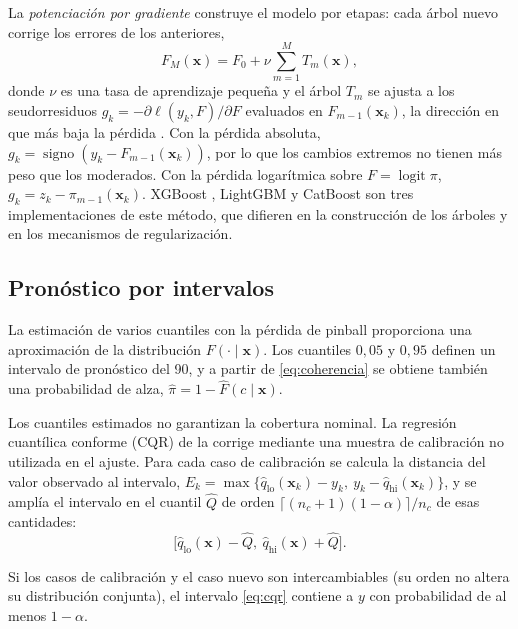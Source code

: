 La \emph{potenciación por gradiente} construye el modelo por etapas: cada árbol nuevo corrige los errores de los anteriores,
\begin{equation}
F_M(\mathbf{x})=F_0+\nu\sum_{m=1}^{M}T_m(\mathbf{x}),
\end{equation}
donde $\nu$ es una tasa de aprendizaje pequeña y el árbol $T_m$ se ajusta a los seudorresiduos $g_k=-\partial\ell(y_k,F)/\partial F$ evaluados en $F_{m-1}(\mathbf{x}_k)$, la dirección en que más baja la pérdida \citep{friedman2001}. Con la pérdida absoluta, $g_k=\operatorname{signo}(y_k-F_{m-1}(\mathbf{x}_k))$, por lo que los cambios extremos no tienen más peso que los moderados. Con la pérdida logarítmica sobre $F=\operatorname{logit}\pi$, $g_k=z_k-\pi_{m-1}(\mathbf{x}_k)$. XGBoost \citep{chen2016}, LightGBM \citep{ke2017} y CatBoost \citep{prokhorenkova2018} son tres implementaciones de este método, que difieren en la construcción de los árboles y en los mecanismos de regularización.


\subsection{Pronóstico por intervalos}
\label{sec:cuantilica}

La estimación de varios cuantiles con la pérdida de pinball proporciona una aproximación de la distribución $F(\cdot\mid\mathbf{x})$. Los cuantiles $0{,}05$ y $0{,}95$ definen un intervalo de pronóstico del 90\pct, y a partir de \eqref{eq:coherencia} se obtiene también una probabilidad de alza, $\hat\pi=1-\hat F(c\mid\mathbf{x})$.

Los cuantiles estimados no garantizan la cobertura nominal. La regresión cuantílica conforme (CQR) de \citet{romano2019} la corrige mediante una muestra de calibración no utilizada en el ajuste. Para cada caso de calibración se calcula la distancia del valor observado al intervalo, $E_k=\max\{\hat q_{\mathrm{lo}}(\mathbf{x}_k)-y_k,\ y_k-\hat q_{\mathrm{hi}}(\mathbf{x}_k)\}$, y se amplía el intervalo en el cuantil $\hat Q$ de orden $\lceil(n_c+1)(1-\alpha)\rceil/n_c$ de esas cantidades:
\begin{equation}
\big[\hat q_{\mathrm{lo}}(\mathbf{x})-\hat Q,\ \hat q_{\mathrm{hi}}(\mathbf{x})+\hat Q\big].
\label{eq:cqr}
\end{equation}

\begin{proposicion}\label{prop:cqr}
Si los casos de calibración y el caso nuevo son intercambiables (su orden no altera su distribución conjunta), el intervalo \eqref{eq:cqr} contiene a $y$ con probabilidad de al menos $1-\alpha$.
\end{proposicion}

